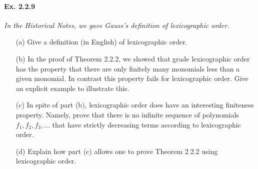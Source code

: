 \documentclass[11pt,a4paper]{article}
\begin{document}
\paragraph{Ex. 2.2.9}

{\it In the Historical Notes, we gave Gauss's definition of lexicographic order.
\begin{enumerate}
 \item[(a)] Give a definition (in English) of lexicographic order.
 \item[(b)] In the proof of Theorem 2.2.2, we showed that grade lexicographic order has the property that there are only finitely many monomials less than a given monomial. In contrast this property fails for lexicographic order. Give an explicit example to illustrate this.
 \item[(c)] In spite of part (b), lexicographic order does have an interesting finiteness property. Namely, prove that there is no infinite sequence of polynomials $f_1,f_2,f_3,\ldots$ that have strictly decreasing terms according to lexicographic  order.
 \item[(d)] Explain how part (c) allows one to prove Theorem 2.2.2 using lexicographic order.
\end{enumerate}
}
\end{document}
